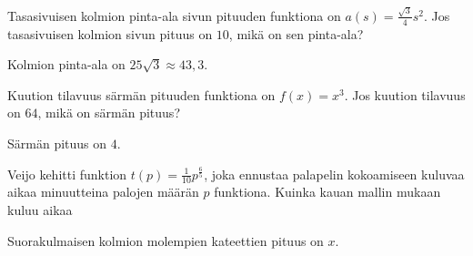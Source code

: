 \begin{tehtavasivu}
\begin{tehtava}
Tasasivuisen kolmion pinta-ala sivun pituuden funktiona on $a(s) = \frac{\sqrt{3}}{4}s^{2}$. Jos tasasivuisen kolmion sivun pituus on $10$, mikä on sen pinta-ala?
\begin{vastaus}
Kolmion pinta-ala on $25\sqrt{3}\approx43,3$.
\end{vastaus}
\end{tehtava}

\begin{tehtava}
Kuution tilavuus särmän pituuden funktiona on $f(x) = x^3$. Jos kuution tilavuus on $64$, mikä on särmän pituus?
\begin{vastaus}
Särmän pituus on $4$.
\end{vastaus}
\end{tehtava}

\begin{tehtava}
Veijo kehitti funktion $t(p)=\frac{1}{10}p^{\frac{6}{5}}$, joka ennustaa palapelin kokoamiseen kuluvaa aikaa minuutteina palojen 
määrän $ p $ funktiona. Kuinka kauan mallin mukaan kuluu aikaa
\begin{alakohdat}
\end{alakohdat}
\begin{vastaus}
\begin{alakohdat}
\end{alakohdat}
\end{vastaus}
\end{tehtava}

\begin{tehtava}
Suorakulmaisen kolmion molempien kateettien pituus on $x$.
\begin{alakohdat}
\end{alakohdat}
\begin{vastaus}
\begin{alakohdat}
\end{alakohdat}
\end{vastaus}
\end{tehtava}


\end{tehtavasivu}
